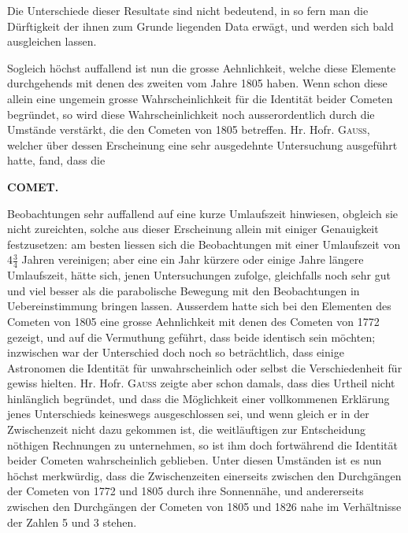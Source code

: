 Die Unterschiede dieser Resultate sind nicht bedeutend, in so fern man die
Dürftigkeit der ihnen zum Grunde liegenden Data erwägt, und werden sich bald
ausgleichen lassen.

Sogleich höchst auffallend ist nun die grosse Aehnlichkeit, welche diese
Elemente durchgehends mit denen des zweiten vom Jahre 1805 haben. Wenn schon
diese allein eine ungemein grosse Wahrscheinlichkeit für die Identität beider
Cometen begründet, so wird diese Wahrscheinlichkeit noch ausserordentlich
durch die Umstände verstärkt, die den Cometen von 1805 betreffen. Hr. Hofr.
\textsc{Gauss}, welcher über dessen Erscheinung eine sehr ausgedehnte Untersuchung
ausgeführt hatte, fand, dass die\par
\clearpage
\noindent{}%
\makebox[12mm][l]{}%
\parbox[t]{\dimexpr\linewidth-24mm\relax}{\centering\footnotesize\bfseries COMET.\par}%
\par\nobreak\medskip
\noindent Beobachtungen sehr auffallend auf eine kurze Umlaufszeit hinwiesen, obgleich sie nicht
zureichten, solche aus dieser Erscheinung allein mit einiger Genauigkeit festzusetzen:
am besten liessen sich die Beobachtungen mit einer Umlaufszeit von $4\frac{3}{4}$ Jahren
vereinigen; aber eine ein Jahr kürzere oder einige Jahre längere Umlaufszeit, hätte sich,
jenen Untersuchungen zufolge, gleichfalls noch sehr gut und viel besser als die
parabolische Bewegung mit den Beobachtungen in Uebereinstimmung bringen lassen.
Ausserdem hatte sich bei den Elementen des Cometen von 1805 eine grosse Aehnlichkeit
mit denen des Cometen von 1772 gezeigt, und auf die Vermuthung geführt, dass beide
identisch sein möchten; inzwischen war der Unterschied doch noch so beträchtlich, dass
einige Astronomen die Identität für unwahrscheinlich oder selbst die Verschiedenheit für
gewiss hielten. Hr. Hofr. \textsc{Gauss} zeigte aber schon damals, dass dies Urtheil nicht
hinlänglich begründet, und dass die Möglichkeit einer vollkommenen Erklärung jenes
Unterschieds keineswegs ausgeschlossen sei, und wenn gleich er in der Zwischenzeit
nicht dazu gekommen ist, die weitläuftigen zur Entscheidung nöthigen Rechnungen zu
unternehmen, so ist ihm doch fortwährend die Identität beider Cometen wahrscheinlich
geblieben. Unter diesen Umständen ist es nun höchst merkwürdig, dass die Zwischenzeiten
einerseits zwischen den Durchgängen der Cometen von 1772 und 1805 durch ihre
Sonnennähe, und andererseits zwischen den Durchgängen der Cometen von 1805 und
1826 nahe im Verhältnisse der Zahlen 5 und 3 stehen.

